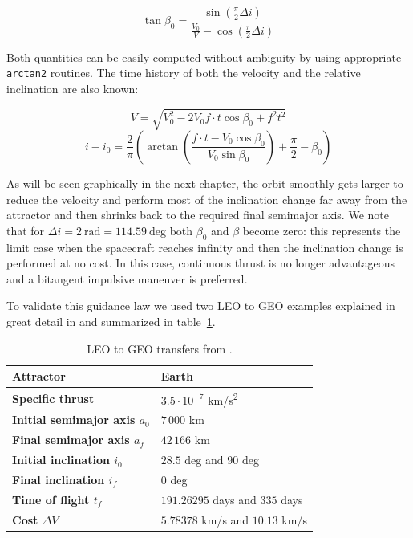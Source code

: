 \[
\tan{\beta_0} = \frac{\sin{ \left( \frac{\pi}{2} \Delta i \right)}}{\frac{V_0}{V} - \cos{ \left( \frac{\pi}{2} \Delta i \right)}}
\]

Both quantities can be easily computed without ambiguity by using appropriate \verb|arctan2| routines. The time history of both the velocity and the relative inclination are also known:

\[
V = \sqrt{ V_0^2 - 2 V_0 f \cdot t \cos{\beta_0} + f^2 t^2 }
\]
\[
i - i_0 = \frac{2}{\pi} \left( \arctan{\left( \frac{f \cdot t - V_0 \cos{\beta_0}}{V_0 \sin{\beta_0}}\right)} + \frac{\pi}{2} - \beta_0 \right)
\]

As will be seen graphically in the next chapter, the orbit smoothly gets larger to reduce the velocity and perform most of the inclination change far away from the attractor and then shrinks back to the required final semimajor axis. We note that for $\Delta i = 2~\text{rad} = 114.59~\text{deg}$ both $\beta_0$ and $\beta$ become zero: this represents the limit case when the spacecraft reaches infinity and then the inclination change is performed at no cost. In this case, continuous thrust is no longer advantageous and a bitangent impulsive maneuver is preferred.

To validate this guidance law we used two LEO to GEO examples explained in great detail in \cite{kechichian1997reformulation} and summarized in table~\ref{tab:leogeo}.

\begin{table}[b]
\centering
\begin{tabular}{|l|l|}
\hline
\textbf{Attractor} & Earth \\ \hline
\textbf{Specific thrust} & $3.5 \cdot 10^{-7}$ km/s\textsuperscript{2} \\ \hline
\textbf{Initial semimajor axis $a_0$} & $7\,000$ km \\ \hline
\textbf{Final semimajor axis $a_f$} & $42\,166$ km \\ \hline
\textbf{Initial inclination $i_0$} & $28.5$ deg and $90$ deg \\ \hline
\textbf{Final inclination $i_f$} & $0$ deg \\ \hline
\textbf{Time of flight $t_f$} & $191.26295$ days and $335$ days \\ \hline
\textbf{Cost $\Delta V$} & $5.78378$ km/s and $10.13$ km/s \\ \hline
\end{tabular}
\caption{LEO to GEO transfers from \cite{kechichian1997reformulation}.}
\label{tab:leogeo}
\end{table}

